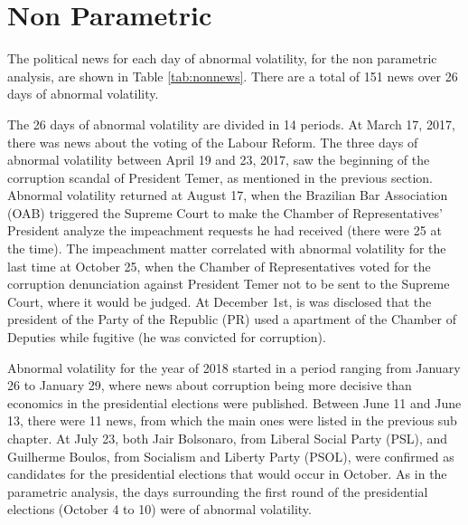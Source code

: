 \documentclass[cic,tc, english]{iiufrgs}
\begin{document}
\section{Non Parametric}

    The political news for each day of abnormal volatility, for the non parametric analysis, are shown in Table \ref{tab:nonnews}. There are a total of 151 news over 26 days of abnormal volatility.

    

    The 26 days of abnormal volatility are divided in 14 periods. At March 17, 2017, there was news about the voting of the Labour Reform. The three days of abnormal volatility between April 19 and 23, 2017, saw the beginning of the corruption scandal of President Temer, as mentioned in the previous section. Abnormal volatility returned at August 17, when the Brazilian Bar Association (OAB) triggered the Supreme Court to make the Chamber of Representatives' President analyze the impeachment requests he had received (there were 25 at the time). The impeachment matter correlated with abnormal volatility for the last time at October 25, when the Chamber of Representatives voted for the corruption denunciation against President Temer not to be sent to the Supreme Court, where it would be judged. At December 1st, is was disclosed that the president of the Party of the Republic (PR) used a apartment of the Chamber of Deputies while fugitive (he was convicted for corruption).

    Abnormal volatility for the year of 2018 started in a period ranging from January 26 to January 29, where news about corruption being more decisive than economics in the presidential elections were published. Between June 11 and June 13, there were 11 news, from which the main ones were listed in the previous sub chapter. At July 23, both Jair Bolsonaro, from Liberal Social Party (PSL), and Guilherme Boulos, from Socialism and Liberty Party (PSOL), were confirmed as candidates for the presidential elections that would occur in October. As in the parametric analysis, the days surrounding the first round of the presidential elections (October 4 to 10) were of abnormal volatility.
\end{document}
